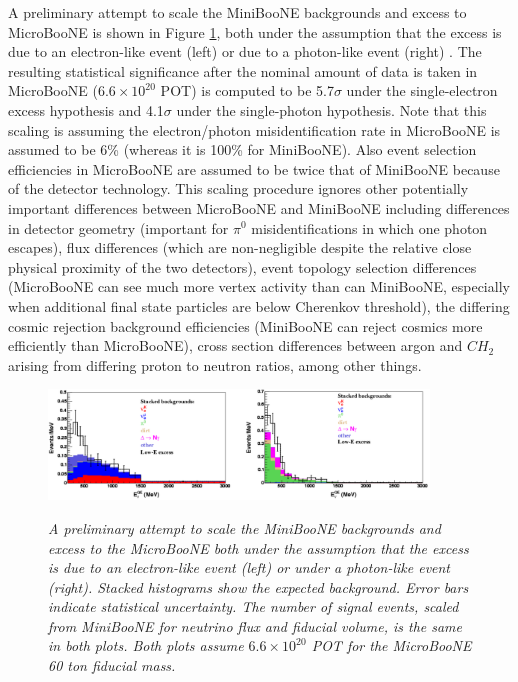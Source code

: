 A preliminary attempt to scale the MiniBooNE backgrounds and excess to MicroBooNE is shown in Figure \ref{TDR_LEE_scaling_fig}, both under the assumption that the excess is due to an electron-like event (left) or due to a photon-like event (right) \cite{UBTDR}. The resulting statistical significance after the nominal amount of data is taken in MicroBooNE ($6.6\times 10^20$ POT) is computed to be 5.7$\sigma$ under the single-electron excess hypothesis and 4.1$\sigma$ under the single-photon hypothesis. Note that this scaling is assuming the electron/photon misidentification rate in MicroBooNE is assumed to be 6\% (whereas it is 100\% for MiniBooNE). Also event selection efficiencies in MicroBooNE are assumed to be twice that of MiniBooNE because of the detector technology. This scaling procedure ignores other potentially important differences between MicroBooNE and MiniBooNE including differences in detector geometry (important for $\pi^0$ misidentifications in which one photon escapes), flux differences (which are non-negligible despite the relative close physical proximity of the two detectors), event topology selection differences (MicroBooNE can see much more vertex activity than can MiniBooNE, especially when additional final state particles are below Cherenkov threshold), the differing cosmic rejection background efficiencies (MiniBooNE can reject cosmics more efficiently than MicroBooNE), cross section differences between argon and $CH_2$ arising from differing proton to neutron ratios, among other things.\\

\begin{figure}[ht!]
\centering
	\includegraphics[width=0.9\textwidth]{Figures/TDR_LEE_scaling.png} \\
\caption{\textit{A preliminary attempt to scale the MiniBooNE backgrounds and excess to the MicroBooNE both under the assumption that the excess is due to an electron-like event (left) or under a photon-like event (right). Stacked histograms show the expected background. Error bars indicate statistical uncertainty. The number of signal events, scaled from MiniBooNE for neutrino flux and fiducial volume, is the same in both plots. Both plots assume $6.6 \times 10^20$ POT for the MicroBooNE 60 ton fiducial mass.}}\label{TDR_LEE_scaling_fig}
\end{figure}

